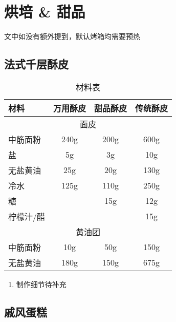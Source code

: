 \chapter{烘培 \& 甜品}

文中如没有额外提到，默认烤箱均需要预热


\section{法式千层酥皮}
\begin{table}[h]
    \centering
    \begin{tabular}{|l||c|c|c|}\hline
     \textbf{材料}    &  \textbf{万用酥皮}& \textbf{甜品酥皮} &\textbf{传统酥皮}\\ \hline\hline
    \multicolumn{4}{|c|}{面皮}\\ \hline
    中筋面粉 & 240g & 200g& 600g\\ \hline
    盐 & 5g & 3g& 10g\\ \hline
    无盐黄油 & 25g & 20g& 130g\\ \hline
    冷水 & 125g & 110g& 250g\\ \hline
    糖 &  & 15g& 12g\\ \hline
    柠檬汁/醋 &  & & 15g\\ \hline
    \multicolumn{4}{|c|}{黄油团}\\ \hline
    中筋面粉 & 10g & 50g& 150g\\ \hline
    无盐黄油 & 180g & 150g& 675g\\ \hline
    \end{tabular}
    \caption{材料表}
\end{table}

\begin{enumerate}
    \item 制作细节待补充

\end{enumerate}


\section{戚风蛋糕}


